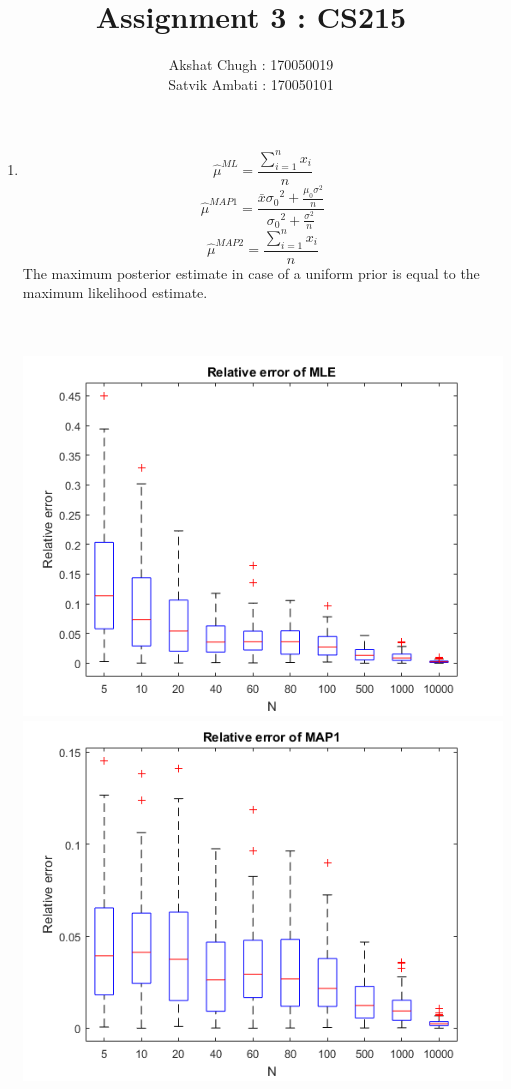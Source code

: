 \documentclass{article}
\title{Assignment 3 : CS215}
\author{Akshat Chugh : 170050019 \\ Satvik Ambati : 170050101}
\begin{document}
	\maketitle
\begin{enumerate}
\item
\begin{equation}
\hat{\mu}^{ML} = \frac{\sum_{i=1}^{n} x_i}{n}
\end{equation}
\begin{equation}
\hat{\mu}^{MAP1} = \frac{\bar{x} {\sigma_0}^2 + \frac{\mu_0 \sigma^2 } {n}}{{\sigma_0}^2 + \frac{\sigma^2} {n}}
\end{equation}
\begin{equation}
\hat{\mu}^{MAP2} = \frac{\sum_{i=1}^{n} x_i}{n}
\end{equation}
The maximum posterior estimate in case of a uniform prior is equal to the maximum likelihood estimate.
\\ \\ \\
\begin{center}
	\includegraphics[scale=0.8]{p1_mle.png}
	\includegraphics[scale=0.8]{p1_map1.png} 

\end{center}
\end{enumerate}
\end{document}
